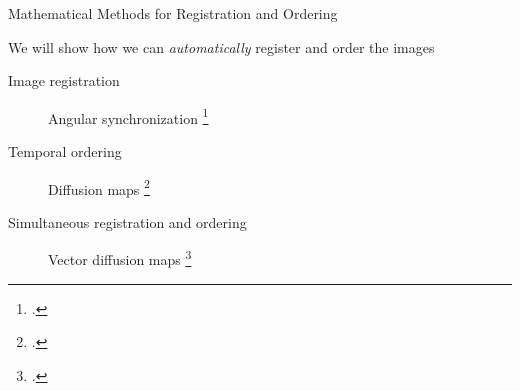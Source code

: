 \documentclass[10pt]{beamer}
\begin{document}
\begin{frame}{Mathematical Methods for Registration and Ordering}

\begin{center}
We will show how we can {\em automatically} register and order the images
\end{center}

\begin{description}
\item[Image registration] Angular synchronization \footcite{singer2011angular}
\item[Temporal ordering] Diffusion maps \footcite{coifman2005geometric}
\item[Simultaneous registration and ordering] Vector diffusion maps \footcite{singer2012vector} 
\end{description}

\end{frame}
\end{document}
